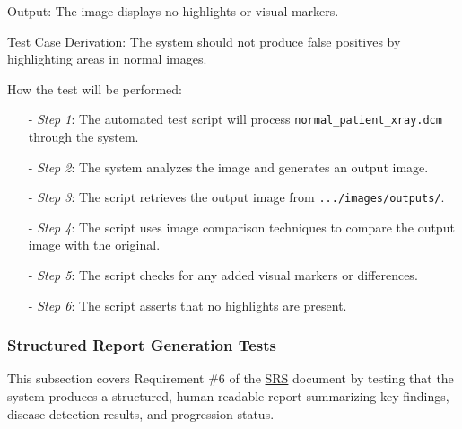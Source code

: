 \documentclass[12pt, titlepage]{article}
\begin{document}
\begin{enumerate}
Output: The image displays no highlights or visual markers.

Test Case Derivation: The system should not produce false positives by highlighting areas in normal images.

How the test will be performed:
\begin{itemize}
\item[-] \textit{Step 1}: The automated test script will process \texttt{normal\_patient\_xray.dcm} through the system.
\item[-] \textit{Step 2}: The system analyzes the image and generates an output image.
\item[-] \textit{Step 3}: The script retrieves the output image from \texttt{.../images/outputs/}.
\item[-] \textit{Step 4}: The script uses image comparison techniques to compare the output image with the original.
\item[-] \textit{Step 5}: The script checks for any added visual markers or differences.
\item[-] \textit{Step 6}: The script asserts that no highlights are present.
\end{itemize}
\end{enumerate}

\subsubsection{Structured Report Generation Tests}

This subsection covers Requirement \#6 of the \href{https://github.com/RezaJodeiri/CXR-Capstone/blob/main/docs/SRS/SRS.pdf}{SRS} \citep{SRS}
document by testing that the system produces a structured, human-readable report summarizing key findings, disease detection results, and progression status.
\end{document}

